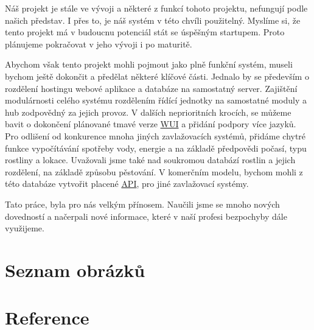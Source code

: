 \documentclass[czech,12pt,a4paper]{article}
\begin{document}
Náš projekt je stále ve vývoji a některé z funkcí tohoto projektu, nefungují podle našich představ. I přes to, je náš systém v této chvíli použitelný. Myslíme si, že tento projekt má v budoucnu potenciál stát se úspěšným startupem. Proto plánujeme pokračovat v jeho vývoji i po maturitě.

Abychom však tento projekt mohli pojmout jako plně funkční systém, museli bychom ještě dokončit a předělat některé klíčové části. Jednalo by se především o rozdělení hostingu webové aplikace a databáze na samostatný server. Zajištění modulárnosti celého systému rozdělením řídící jednotky na samostatné moduly a hub zodpovědný za jejich provoz. V dalších neprioritních krocích, se můžeme bavit o dokončení plánované tmavé verze \underline{\ac{WUI}} a přidání podpory více jazyků. Pro odlišení od konkurence mnoha jiných zavlažovacích systémů, přidáme chytré funkce vypočítávání spotřeby vody, energie a na základě předpovědi počasí, typu rostliny a lokace. Uvažovali jsme také nad soukromou databází rostlin a jejich rozdělení, na základě způsobu pěstování. V komerčním modelu, bychom mohli z této databáze vytvořit placené \underline{\ac{API}}, pro jiné zavlažovací systémy.

Tato práce, byla pro nás velkým přínosem. Naučili jsme se mnoho nových dovedností a načerpali nové informace, které v naší profesi bezpochyby dále využijeme.

\clearpage

\section{Seznam obrázků} \label{secObrazky}

\vspace*{-1.5cm}
\listoffigures

\clearpage

\section{Reference} \label{secReference}
\end{document}
